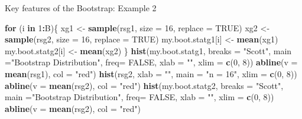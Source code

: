 \documentclass[
  ignorenonframetext,
]{beamer}
\newenvironment{Shaded}{\begin{snugshade}}{\end{snugshade}}
\newcommand{\AttributeTok}[1]{\textcolor[rgb]{0.13,0.29,0.53}{#1}}
\newcommand{\ConstantTok}[1]{\textcolor[rgb]{0.56,0.35,0.01}{#1}}
\newcommand{\ControlFlowTok}[1]{\textcolor[rgb]{0.13,0.29,0.53}{\textbf{#1}}}
\newcommand{\DecValTok}[1]{\textcolor[rgb]{0.00,0.00,0.81}{#1}}
\newcommand{\FunctionTok}[1]{\textcolor[rgb]{0.13,0.29,0.53}{\textbf{#1}}}
\newcommand{\NormalTok}[1]{#1}
\newcommand{\OtherTok}[1]{\textcolor[rgb]{0.56,0.35,0.01}{#1}}
\newcommand{\SpecialCharTok}[1]{\textcolor[rgb]{0.81,0.36,0.00}{\textbf{#1}}}
\newcommand{\StringTok}[1]{\textcolor[rgb]{0.31,0.60,0.02}{#1}}
\begin{document}
\begin{frame}[fragile]{Key features of the Bootstrap: Example 2}
\begin{Shaded}
\begin{Highlighting}[]
\ControlFlowTok{for}\NormalTok{ (i }\ControlFlowTok{in} \DecValTok{1}\SpecialCharTok{:}\NormalTok{B)\{}
\NormalTok{  xg1 }\OtherTok{\textless{}{-}} \FunctionTok{sample}\NormalTok{(rsg1, }\AttributeTok{size =} \DecValTok{16}\NormalTok{, }\AttributeTok{replace =} \ConstantTok{TRUE}\NormalTok{)}
\NormalTok{  xg2 }\OtherTok{\textless{}{-}} \FunctionTok{sample}\NormalTok{(rsg2, }\AttributeTok{size =} \DecValTok{16}\NormalTok{, }\AttributeTok{replace =} \ConstantTok{TRUE}\NormalTok{)}
\NormalTok{  my.boot.statg1[i] }\OtherTok{\textless{}{-}} \FunctionTok{mean}\NormalTok{(xg1)}
\NormalTok{  my.boot.statg2[i] }\OtherTok{\textless{}{-}} \FunctionTok{mean}\NormalTok{(xg2)}
\NormalTok{\}}
\FunctionTok{hist}\NormalTok{(my.boot.statg1, }\AttributeTok{breaks =} \StringTok{"Scott"}\NormalTok{,  }\AttributeTok{main =}\StringTok{"Bootstrap Distribution"}\NormalTok{, }\AttributeTok{freq=} \ConstantTok{FALSE}\NormalTok{, }\AttributeTok{xlab =} \StringTok{""}\NormalTok{, }
\AttributeTok{xlim =} \FunctionTok{c}\NormalTok{(}\DecValTok{0}\NormalTok{, }\DecValTok{8}\NormalTok{))}
\FunctionTok{abline}\NormalTok{(}\AttributeTok{v =} \FunctionTok{mean}\NormalTok{(rsg1), }\AttributeTok{col =} \StringTok{"red"}\NormalTok{)}
\FunctionTok{hist}\NormalTok{(rsg2, }\AttributeTok{xlab =} \StringTok{""}\NormalTok{, }\AttributeTok{main =} \StringTok{"n = 16"}\NormalTok{, }\AttributeTok{xlim =} \FunctionTok{c}\NormalTok{(}\DecValTok{0}\NormalTok{, }\DecValTok{8}\NormalTok{))}
\FunctionTok{abline}\NormalTok{(}\AttributeTok{v =} \FunctionTok{mean}\NormalTok{(rsg2), }\AttributeTok{col =} \StringTok{"red"}\NormalTok{)}
\FunctionTok{hist}\NormalTok{(my.boot.statg2, }\AttributeTok{breaks =} \StringTok{"Scott"}\NormalTok{,  }\AttributeTok{main =}\StringTok{"Bootstrap Distribution"}\NormalTok{, }\AttributeTok{freq=} \ConstantTok{FALSE}\NormalTok{, }\AttributeTok{xlab =} \StringTok{""}\NormalTok{, }
\AttributeTok{xlim =} \FunctionTok{c}\NormalTok{(}\DecValTok{0}\NormalTok{, }\DecValTok{8}\NormalTok{))}
\FunctionTok{abline}\NormalTok{(}\AttributeTok{v =} \FunctionTok{mean}\NormalTok{(rsg2), }\AttributeTok{col =} \StringTok{"red"}\NormalTok{)}
\end{Highlighting}
\end{Shaded}

\normalsize
\end{frame}
\end{document}
